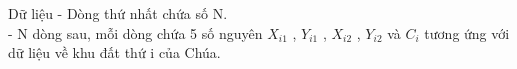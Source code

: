 Dữ liệu
- Dòng thứ nhất chứa số N.
\\- N dòng sau, mỗi dòng chứa 5 số nguyên $X_{i1}$ , $Y_{i1}$ , $X_{i2}$ , $Y_{i2}$ và $C_{i}$ tương ứng với dữ liệu về khu đất thứ i của Chúa.